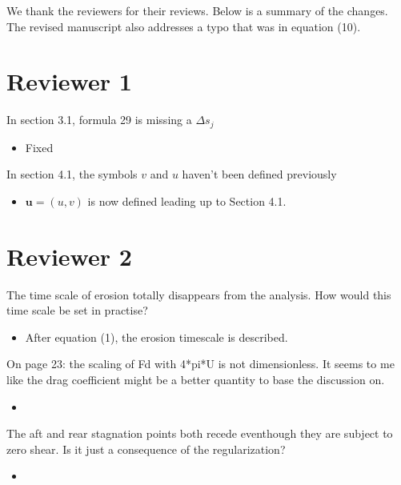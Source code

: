 \documentclass[11pt]{article}
\newcommand{\comment}[1]{{\color{blue} #1}}
\begin{document}
\noindent
We thank the reviewers for their reviews.  Below is a summary of the
changes.  The revised manuscript also addresses a typo that was in
equation (10).

\section*{Reviewer 1}

\noindent
\comment{In section 3.1, formula 29 is missing a $\Delta s_{j}$}
\begin{itemize}
  \item Fixed
\end{itemize}

\noindent
\comment{In section 4.1, the symbols $v$ and $u$ haven't been defined
previously}
\begin{itemize}
  \item $\mathbf{u} = (u,v)$ is now defined leading up to Section 4.1.
\end{itemize}



\section*{Reviewer 2}
\noindent
\comment{The time scale of erosion totally disappears from the analysis.
How would this time scale be set in practise?}
\begin{itemize}
  \item After equation (1), the erosion timescale is described.
\end{itemize}

\noindent
\comment{On page 23: the scaling of Fd with 4*pi*U is not dimensionless.
It seems to me like the drag coefficient might be a better quantity to
base the discussion on.}
\begin{itemize}
  \item 
\end{itemize}

\noindent
\comment{The aft and rear stagnation points both recede eventhough they
are subject to zero shear. Is it just a consequence of the
regularization?}
\begin{itemize}
  \item 
\end{itemize}
\end{document}
